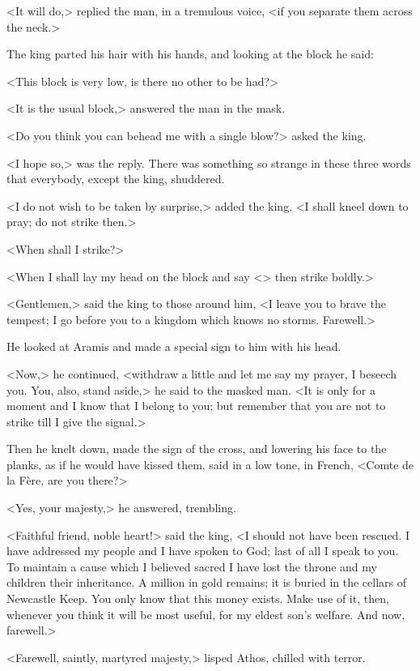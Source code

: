 <It will do,> replied the man, in a tremulous voice, <if you separate them across the neck.>

The king parted his hair with his hands, and looking at the block he said:

<This block is very low, is there no other to be had?>

<It is the usual block,> answered the man in the mask.

<Do you think you can behead me with a single blow?> asked the king.

<I hope so,> was the reply. There was something so strange in these three words that everybody, except the king, shuddered.

<I do not wish to be taken by surprise,> added the king. <I shall kneel down to pray; do not strike then.>

<When shall I strike?>

<When I shall lay my head on the block and say <> then strike boldly.>

<Gentlemen,> said the king to those around him, <I leave you to brave the tempest; I go before you to a kingdom which knows no storms. Farewell.>

He looked at Aramis and made a special sign to him with his head.

<Now,> he continued, <withdraw a little and let me say my prayer, I beseech you. You, also, stand aside,> he said to the masked man. <It is only for a moment and I know that I belong to you; but remember that you are not to strike till I give the signal.>

Then he knelt down, made the sign of the cross, and lowering his face to the planks, as if he would have kissed them, said in a low tone, in French, <Comte de la Fère, are you there?>

<Yes, your majesty,> he answered, trembling.

<Faithful friend, noble heart!> said the king, <I should not have been rescued. I have addressed my people and I have spoken to God; last of all I speak to you. To maintain a cause which I believed sacred I have lost the throne and my children their inheritance. A million in gold remains; it is buried in the cellars of Newcastle Keep. You only know that this money exists. Make use of it, then, whenever you think it will be most useful, for my eldest son's welfare. And now, farewell.>

<Farewell, saintly, martyred majesty,> lisped Athos, chilled with terror.

